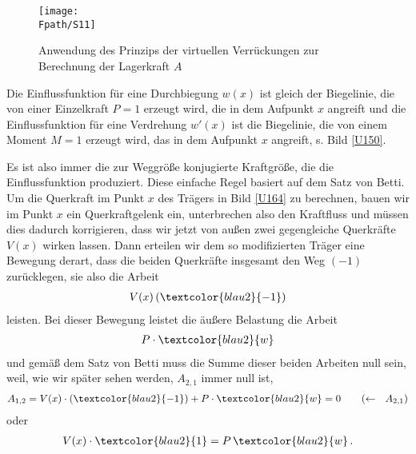 {{{%
\begin{figure}[tbp]
\centering
\if {} \sidecaption \fi
\texttt{[image: \\Fpath/S11]}
\caption{Anwendung des Prinzips der virtuellen Verr\"{u}ckungen zur Berechnung der Lagerkraft $A$} \label{S11}
%
\end{figure}%

Die Einflussfunktion f\"{u}r eine Durchbiegung $w(x)$ ist gleich der Biegelinie, die von einer Einzelkraft $P = 1$ erzeugt wird, die in dem Aufpunkt $x$ angreift und die Einflussfunktion f\"{u}r eine Verdrehung $w'(x)$ ist die Biegelinie, die von einem Moment $M = 1$ erzeugt wird,
das in dem Aufpunkt $x$ angreift, s. Bild \ref{U150}.

Es ist also immer die zur Weggr\"{o}{\ss}e konjugierte Kraftgr\"{o}{\ss}e, die die Einflussfunktion produziert. Diese einfache Regel basiert auf dem Satz von Betti.\\

Um die Querkraft im Punkt $x$ des Tr\"{a}gers in Bild  \ref{U164} zu berechnen, bauen wir im Punkt $x$ ein Querkraftgelenk ein, unterbrechen also den Kraftfluss und m\"{u}ssen dies dadurch korrigieren, dass wir jetzt von au{\ss}en zwei gegengleiche Querkr\"{a}fte $V(x)$ wirken lassen. Dann erteilen wir dem so modifizierten Tr\"{a}ger eine Bewegung derart, dass die beiden Querkr\"{a}fte insgesamt den Weg $(-1)$ zur\"{u}cklegen, sie also die Arbeit
\begin{align}
V(x)\,(\textcolor{blau2}{-1})
\end{align}
leisten. Bei dieser Bewegung leistet die \"{a}u{\ss}ere Belastung die Arbeit
\begin{align}
P\cdot \textcolor{blau2}{w}
\end{align}
und gem\"{a}{\ss} dem Satz von Betti muss die Summe dieser beiden Arbeiten null sein, weil, wie wir sp\"{a}ter sehen werden, $A_{2,1}$ immer null ist,
\begin{align}
A_{1,2} = V(x)\cdot (\textcolor{blau2}{-1}) + P\cdot\textcolor{blau2}{w} = 0 \qquad (\leftarrow \,\,\,\,A_{2,1})
\end{align}
oder
\begin{align}
V(x) \cdot \textcolor{blau2}{1} = P\,\textcolor{blau2}{w}\,.
\end{align}\\

}}}
